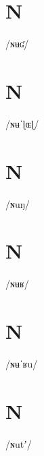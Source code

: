\documentclass[10pt,a4paper,twoside]{book}
\begin{document}
\section*{N}

\begin{multicols}{3}
 {/ɴʉʛ/} {}
\end{multicols}

\section*{N}

\begin{multicols}{3}
 {/ɴʉˈɭɶɭ/} {}
\end{multicols}

\section*{N}

\begin{multicols}{3}
 {/ɴuŋ/} {}
\end{multicols}

\section*{N}

\begin{multicols}{3}
 {/ɴʉʁ/} {}
\end{multicols}

\section*{N}

\begin{multicols}{3}
 {/ɴʉˈʁu/} {}
\end{multicols}

\section*{N}

\begin{multicols}{3}
 {/ɴutʼ/} {}
\end{multicols}
\end{document}
